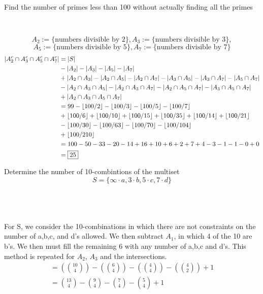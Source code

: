 \documentclass[12pt,letterpaper,boxed]{hmcpset}
\DeclarePairedDelimiter\floor{\lfloor}{\rfloor}
\begin{document}
\begin{problem}[Shahriari 8.1.15][20]\\
Find the number of primes less than 100 without actually finding all the primes
\end{problem}\\

\begin{solution}%
\[
A_2:= \{ \text{numbers divisible by 2} \},
A_3:= \{ \text{numbers divisible by 3} \},
\] \[
A_5:= \{ \text{numbers divisible by 5} \},
A_7:= \{ \text{numbers divisible by 7} \}
\]
\begin{align*}
|A_2^c \cap A_3^c \cap A_5^c \cap A_7^c| &= |S| \\
& - |A_2| - |A_3| - |A_5| - |A_7| \\
& + |A_2 \cap A_3| - |A_2 \cap A_5| - |A_2 \cap A_7| - |A_3 \cap A_5| - |A_3 \cap A_7|-|A_5 \cap A_7|  \\
&-|A_2 \cap A_3 \cap A_5|-|A_2 \cap A_3 \cap  A_7|-|A_2  \cap A_5 \cap  A_7|- | A_3 \cap A_5 \cap  A_7|\\
&+|A_2 \cap A_3 \cap A_5 \cap  A_7|\\
&=99-\floor*{100/2}-\floor*{100/3}-\floor*{100/5}-\floor*{100/7}\\
&+\floor*{100/6}+\floor*{100/10}+\floor*{100/15}+\floor*{100/35}+\floor*{100/14}+\floor*{100/21}\\
&-\floor*{100/30}-\floor*{100/63}-\floor*{100/70}-\floor*{100/104}\\
&+\floor*{100/210}\\
&=100-50-33-20-14+16+10+6+2+7+4-3-1-1-0+0\\
&=\boxed{25}
\end{align*}
\end{solution}

\begin{problem}[Shahriari 8.2.1][20]
Determine the number of 10-combintions of the multiset
$$S = \{ \infty \cdot a, 3 \cdot b, 5 \cdot c, 7 \cdot d \}$$
\end{problem}

\begin{solution}%
\\
\\ 
\\
For S, we consider the 10-combinations in which there are not constraints on the number of a,b,c, and d's allowed. We then subtract $A_1$, in which 4 of the 10 are b's. We then must fill the remaining 6 with any number of a,b,c and d's. This method is repeated for $A_2$, $A_3$ and the intersections.
\begin{align*}
= (\binom{10}{4}) - (\binom{6}{4}) - (\binom{4}{4}) -(\binom{4}{2})+1\\
= \binom{13}{4}-\binom{9}{4}-\binom{7}{4}-\binom{5}{4} + 1
\end{align*}
\end{solution}
\end{document}
